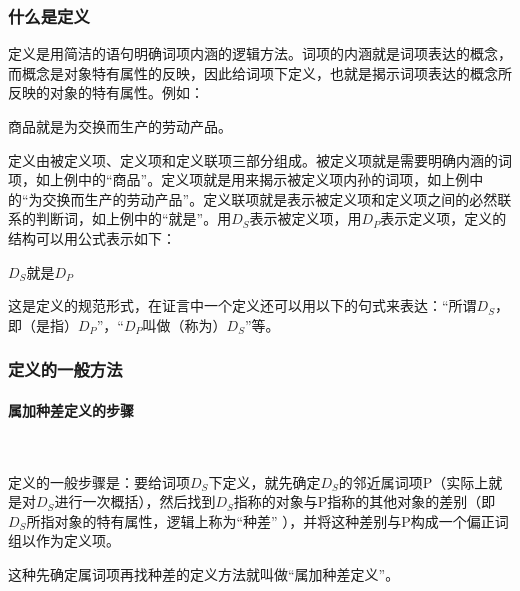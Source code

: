 \documentclass[
    a4paper,
    twoside
    ]{article}
\begin{document}
        \subsubsection{什么是定义}
        {
            定义是用简洁的语句明确词项内涵的逻辑方法。词项的内涵就是词项表达的概念，而概念是对象特有属性的反映，因此给词项下定义，也就是揭示词项表达的概念所反映的对象的特有属性。例如：

            {\fangsong{}
                商品就是为交换而生产的劳动产品。
            }

            定义由被定义项、定义项和定义联项三部分组成。被定义项就是需要明确内涵的词项，如上例中的``商品''。定义项就是用来揭示被定义项内孙的词项，如上例中的``为交换而生产的劳动产品''。定义联项就是表示被定义项和定义项之间的必然联系的判断词，如上例中的``就是''。用$D_S$表示被定义项，用$D_P$表示定义项，定义的结构可以用公式表示如下：

            $D_S$就是$D_P$

            这是定义的规范形式，在证言中一个定义还可以用以下的句式来表达：``所谓$D_S$，即（是指）$D_P$''，``$D_P$叫做（称为）$D_S$''等。


        }

        \subsubsection{
            定义的一般方法
        }
        \paragraph{
            属加种差定义的步骤
        }~{}
        \newline
        {
            定义的一般步骤是：要给词项$D_S$下定义，就先确定$D_S$的邻近属词项P（实际上就是对$D_S$进行一次概括），然后找到$D_S$指称的对象与P指称的其他对象的差别（即$D_S$所指对象的特有属性，逻辑上称为``种差'' ），并将这种差别与P构成一个偏正词组以作为定义项。

            这种先确定属词项再找种差的定义方法就叫做``属加种差定义''。

        }
\end{document}
